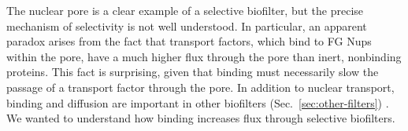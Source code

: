 %
%

The nuclear pore is a clear example of a selective biofilter, but the precise mechanism of selectivity is not well understood.  In particular, an apparent paradox arises from the fact that transport factors, which bind to FG Nups within the pore, have a much higher flux through the pore than inert, nonbinding proteins.  This fact is surprising, given that binding must necessarily slow the passage of a transport factor through the pore.  In addition to nuclear transport, binding and diffusion are important in other biofilters (Sec.~\ref{sec:other-filters}) \cite{schneider17, huang17, mastorakos15,brangwynne15, feric16,witten17}.  We wanted to understand how binding increases flux through selective biofilters.


